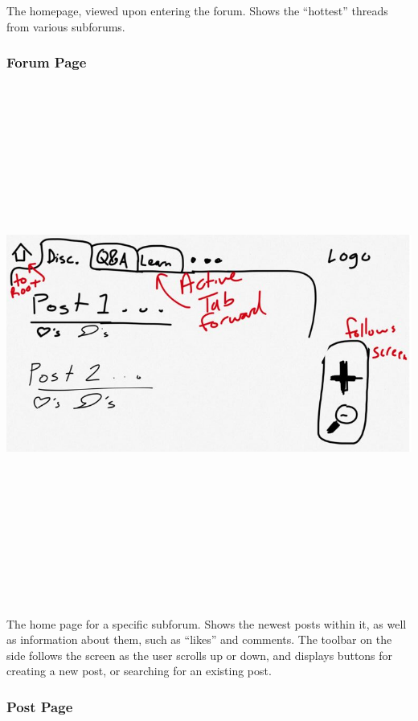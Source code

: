 \documentclass[12pt]{scrartcl}
\begin{document}
The homepage, viewed upon entering the forum. Shows the “hottest” threads from various subforums.

\subsubsection{Forum Page}

\includegraphics[width=17cm, height=17cm, keepaspectratio]{forumpage.png}

The home page for a specific subforum. Shows the newest posts within it, as well as information about them, such as “likes” and comments. The toolbar on the side follows the screen as the user scrolls up or down, and displays buttons for creating a new post, or searching for an existing post.

\subsubsection{Post Page}
\end{document}
